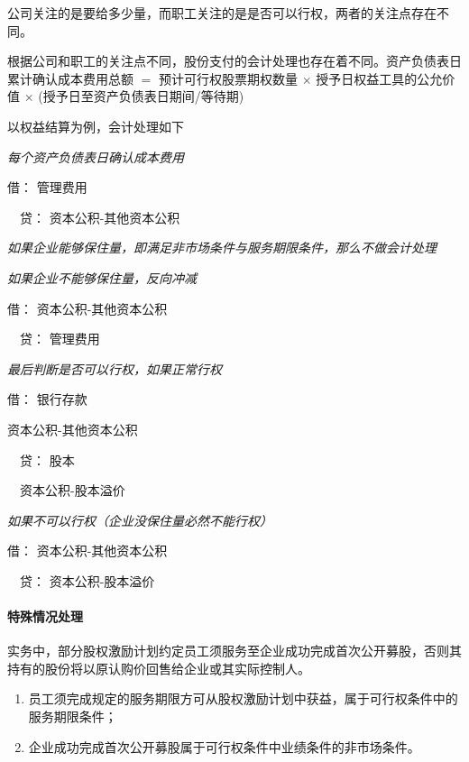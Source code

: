 \documentclass[UTF8,12pt]{ctexart}
\newenvironment{Dr}{\noindent 借：}{\par}
\newenvironment{Cr}{\noindent \ \ 贷：}{\par}
\numberwithin{equation}{section} %
\numberwithin{figure}{section}
\numberwithin{table}{section}
\begin{document}
	公司关注的是要给多少量，而职工关注的是是否可以行权，两者的关注点存在不同。
	
	根据公司和职工的关注点不同，股份支付的会计处理也存在着不同。资产负债表日累计确认成本费用总额 $=$ 预计可行权股票期权数量 $\times$ 授予日权益工具的公允价值 $\times$ (授予日至资产负债表日期间/等待期)
	
	以权益结算为例，会计处理如下
	
	\textit{每个资产负债表日确认成本费用}
	
	\begin{Dr}
		管理费用
	\end{Dr}
	\begin{Cr}
		资本公积-其他资本公积
	\end{Cr}

	\textit{如果企业能够保住量，即满足非市场条件与服务期限条件，那么不做会计处理}
	
	\textit{如果企业不能够保住量，反向冲减}
	
	\begin{Dr}
		资本公积-其他资本公积
	\end{Dr}
	\begin{Cr}
		管理费用
	\end{Cr}

	\textit{最后判断是否可以行权，如果正常行权}
	
	\begin{Dr}
		银行存款
		
		资本公积-其他资本公积
	\end{Dr}
	\begin{Cr}
		股本
		
		\ \ 资本公积-股本溢价
	\end{Cr}

	\textit{如果不可以行权（企业没保住量必然不能行权）}
	
	\begin{Dr}
		资本公积-其他资本公积
	\end{Dr}
	\begin{Cr}
		资本公积-股本溢价
	\end{Cr}
	
	\paragraph{特殊情况处理}
	实务中，部分股权激励计划约定员工须服务至企业成功完成首次公开募股，否则其持有的股份将以原认购价回售给企业或其实际控制人。
	
	\begin{enumerate}
		\item 员工须完成规定的服务期限方可从股权激励计划中获益，属于可行权条件中的服务期限条件；
		
		\item 企业成功完成首次公开募股属于可行权条件中业绩条件的非市场条件。
	\end{enumerate}
\end{document}
